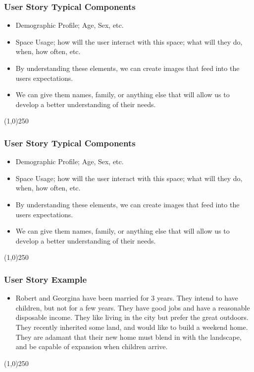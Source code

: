 \begin{frame}
\frametitle{User Story \hfill\hfill Typical Components}
\begin{itemize}
	\item Demographic Profile; Age, Sex, etc.
	\item Space Usage; how will the user interact with this space; what will they do, when, how often, etc.
	\item By understanding these elements, we can create images that feed into the users expectations.
	\item We can give them names, family, or anything else that will allow us to develop a better understanding of their needs.
\end{itemize}
\end{frame}
\begin{center}\line(1,0){250}\end{center}



\begin{frame}
\frametitle{User Story \hfill\hfill Typical Components}
\begin{itemize}
	\item Demographic Profile; Age, Sex, etc.
	\item Space Usage; how will the user interact with this space; what will they do, when, how often, etc.
	\item By understanding these elements, we can create images that feed into the users expectations.
	\item We can give them names, family, or anything else that will allow us to develop a better understanding of their needs.
\end{itemize}
\end{frame}
\begin{center}\line(1,0){250}\end{center}





\begin{frame}
\frametitle{User Story \hfill\hfill Example}
\begin{itemize}
	\item Robert and Georgina have been married for 3 years.  They intend to have children, but not for a few years.  They have good jobs and have a reasonable disposable income.  They like living in the city but prefer the great outdoors.  They recently inherited some land, and would like to build a weekend home.  They are adamant that their new home must blend in with the landscape, and be capable of expansion when children arrive.
\end{itemize}
\end{frame}
\begin{center}\line(1,0){250}\end{center}


